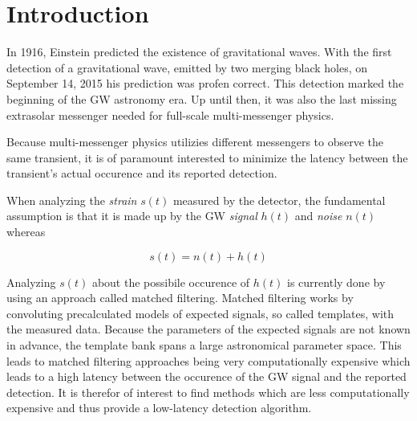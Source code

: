 

\section{Introduction}
In 1916, Einstein predicted the existence of gravitational waves. With the first
detection of a gravitational wave\cite{PhysRevLett.116.061102}, emitted by two 
merging black holes, on September 14, 2015 his prediction was profen correct.
This detection marked the beginning
of the GW astronomy era. Up until then, it was also the last missing
 extrasolar messenger needed for full-scale multi-messenger physics.
\cite{Branchesi_2016} 

Because multi-messenger physics utilizies different messengers to observe the 
same transient, it is of paramount interested to minimize the latency between 
the transient's actual occurence and its reported detection.

When analyzing the \textit{strain} $s(t)$ measured by the detector, the
fundamental assumption is that it is made up by the GW \textit{signal} $h(t)$
and \textit{noise} $n(t)$ whereas

\begin{equation}
  s(t) = n(t) + h(t)
\end{equation}

Analyzing $s(t)$ about the possibile occurence of $h(t)$ is currently done by
using an approach called matched filtering. Matched filtering works by 
convoluting precalculated
models of expected signals, so called templates, with the measured data.
Because the parameters of the expected signals are not known in advance, the
template bank spans a large astronomical parameter space. This leads to
matched filtering approaches being very computationally expensive which leads
to a high latency between the occurence of the GW signal and the reported
detection. It is therefor of interest to find methods which are less
computationally expensive and thus provide a low-latency detection algorithm.


